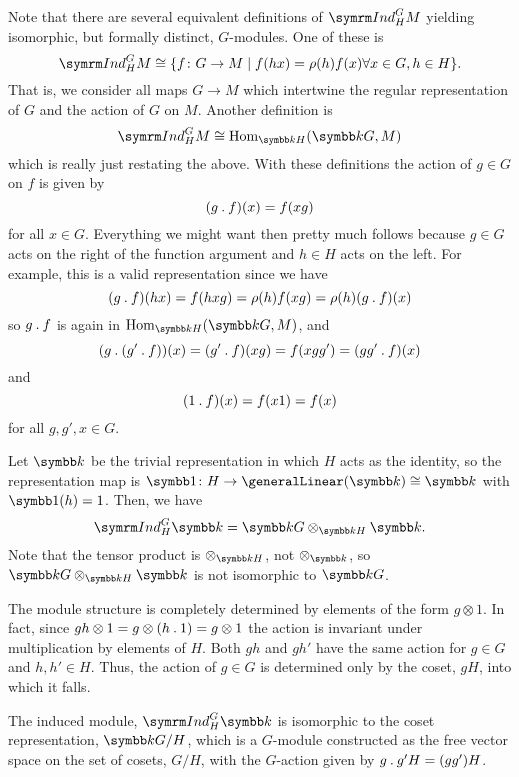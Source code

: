 Note that there are several equivalent definitions of \(\Ind^G_H M\) yielding isomorphic, but formally distinct, \(G\)-modules.
One of these is
\begin{equation}
    \Ind^G_H M \isomorphic \{f \colon G \to M \mid f(hx) = \rho(h)f(x) \forall x \in G, h \in H\}.
\end{equation}
That is, we consider all maps \(G \to M\) which intertwine the regular representation of \(G\) and the action of \(G\) on \(M\).
Another definition is
\begin{equation}
    \Ind^G_H M \isomorphic \Hom_{\field H}(\field G, M)
\end{equation}
which is really just restating the above.
With these definitions the action of \(g \in G\) on \(f\) is given by
\begin{equation}
    (g \mathbin{.} f)(x) = f(xg)
\end{equation}
for all \(x \in G\).
Everything we might want then pretty much follows because \(g \in G\) acts on the right of the function argument and \(h \in H\) acts on the left.
For example, this is a valid representation since we have
\begin{equation}
    (g \mathbin{.} f)(hx) = f(hxg) = \rho(h)f(xg) = \rho(h)(g \mathbin{.} f)(x)
\end{equation}
so \(g \mathbin{.} f\) is again in \(\Hom_{\field H}(\field G, M)\), and
\begin{equation}
    (g \mathbin{.} (g' \mathbin{.} f))(x) = (g' \mathbin{.} f)(xg) = f(xgg') = (gg' \mathbin{.} f)(x)
\end{equation}
and
\begin{equation}
    (1 \mathbin{.} f)(x) = f(x1) = f(x)
\end{equation}
for all \(g, g', x \in G\).

\begin{exm}{}{}
    Let \(\field\) be the trivial representation in which \(H\) acts as the identity, so the representation map is \(\one \colon H \to \generalLinear(\field) \isomorphic \field\) with \(\one(h) = 1\).
    Then, we have
    \begin{equation}
        \Ind^G_H \field = \field G \otimes_{\field H} \field.
    \end{equation}
    Note that the tensor product is \(\otimes_{\field H}\), not \(\otimes_{\field}\), so \(\field G \otimes_{\field H} \field\) is not isomorphic to \(\field G\).
    
    The module structure is completely determined by elements of the form \(g \otimes 1\).
    In fact, since \(gh \otimes 1 = g \otimes (h \mathbin{.} 1) = g \otimes 1\) the action is invariant under multiplication by elements of \(H\).
    Both \(gh\) and \(gh'\) have the same action for \(g \in G\) and \(h, h' \in H\).
    Thus, the action of \(g \in G\) is determined only by the coset, \(gH\), into which it falls.
    
    The induced module, \(\Ind^G_H \field\) is isomorphic to the coset representation, \(\field G/H\), which is a \(G\)-module constructed as the free vector space on the set of cosets, \(G/H\), with the \(G\)-action given by \(g \mathbin{.} g'H = (gg')H\).
\end{exm}

